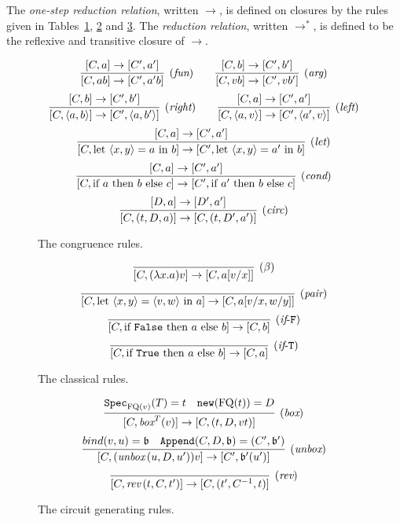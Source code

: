\documentclass[twoside]{article}
\begin{document}
\begin{definition}
The \emph{one-step reduction relation}, written $\to$, is defined 
on closures by the rules given in Tables~\hyperref[cong_rules]{\ref*{cong_rules}}, 
\hyperref[classical_rules]{\ref*{classical_rules}} 
and \hyperref[circ_gen_rules]{\ref*{circ_gen_rules}}. 
The \emph{reduction relation}, 
written $\to^*$, is defined to be the reflexive and transitive closure of $\to$.
\end{definition}

\begin{figure}[p]
\begin{mdframed}
\[
  \infer[(\rul{fun})]{[C,ab]\to[C',a'b]}{
    [C,a]\to[C',a']
  }
~~~~~~
  \infer[(\rul{arg})]{[C,vb]\to [C',vb']}{
    [C,b]\to [C',b']
  }
\]
\[
  \infer[(\rul{right})]{[C,\langle a,b\rangle]\to [C',\langle a,b'\rangle]}{
    [C,b]\to [C',b']
  }
~~~~~~
  \infer[(\rul{left})]{[C,\langle a,v\rangle]\to [C',\langle a',v\rangle]}{
    [C,a]\to [C',a']
  }
\]
\[
  \infer[(\rul{let})]{[C,\letin{\p{x,y}}{a}{b}]\to 
                [C', \letin{\p{x,y}}{a'}{b}]}{
    [C,a]\to [C',a']
  }
\]
\[
  \infer[(\rul{cond})]{[C, \ifthenelse{a}{b}{c}]\to [C', \ifthenelse{a'}{b}{c}]}{
    [C,a]\to [C',a']
  }
\]
\[
  \infer[(\rul{circ})]{[C, (t,D,a)]\to [C, (t,D',a')]}{
    [D,a]\to [D',a']
  }
\]
\end{mdframed}
\caption{The congruence rules.}
\label{cong_rules}
\end{figure}

\begin{figure}[p]
\begin{mdframed}
\[
  \infer[(\beta)]{[C,(\lambda x.a)v]\to [C, a[v/x]]}{}
\]
\[
  \infer[(\rul{pair})]{[C,\letin{\p{x,y}}{\p{v,w}}{a}]\to[C,a[v/x,w/y]]}{}
\]
\[
  \infer[(\rul{if}\mbox{-}\mathtt{F})]{[C,\ifthenelse{\mathtt{False}}{a}{b}] \to [C, b]}{}
\]
\[
  \infer[(\rul{if}\mbox{-}\mathtt{T})]{[C,\ifthenelse{\mathtt{True}}{a}{b}] \to [C, a]}{}
\]
\end{mdframed}
\caption{The classical rules.}
\label{classical_rules}
\end{figure}

\begin{figure}[p]
\begin{mdframed}
\[
  \infer[(\boxx)]{[C,\boxx^T(v)]\to [C,(t,D,vt)]}{
    \spec_{\FQ(v)}(T)=t
    &
    \mathtt{new}(\FQ(t))=D
  }
\]
\[
  \infer[(\unbox)]{[C,(\unbox\,(u,D,u'))v]\to [C',\binding'(u')]}{
    bind(v,u)=\binding 
    &
    \mathtt{Append}(C,D,\binding) = (C',\binding') 
  }
\]
\[
  \infer[(\rev)]{[C,\rev\,(t,C,t')]\to [C,(t',C^{-1},t)]}{}
\]
\end{mdframed}
\caption{The circuit generating rules.}
\label{circ_gen_rules}
\end{figure}
\end{document}
